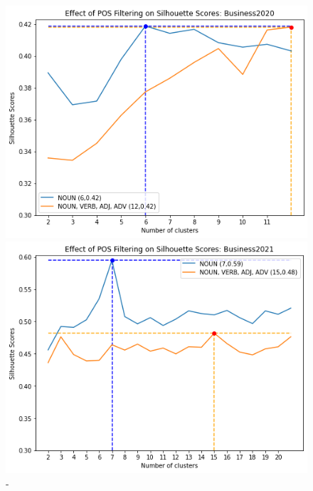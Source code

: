 \begin{figure}[H]
\centering
  \begin{minipage}[t]{.35\linewidth}
    \centering
    \includegraphics[width=\linewidth]{images/eval/business2020_sil.png}
    \caption{-}
    \label{fig:pos_business2020}
  \end{minipage}
  \begin{minipage}[t]{.35\textwidth}
    \centering
    \includegraphics[width=\linewidth]{images/eval/business2021_sil.png}
    \caption{-}
    \label{fig:pos_business2021}
  \end{minipage}
  \begin{minipage}[t]{.35\textwidth}
    \centering

\end{minipage}
\end{figure}
